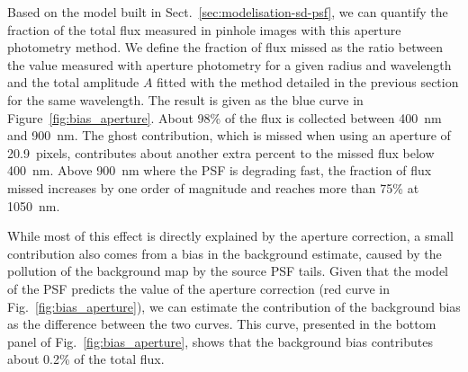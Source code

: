 Based on the model built in Sect.~\ref{sec:modelisation-sd-psf}, we can quantify the fraction of the total flux measured in \spinhole pinhole images with this aperture photometry method. We define the fraction of flux missed as the ratio between the value measured with aperture photometry for a given radius and wavelength and the total amplitude $A$ fitted with the method detailed in the previous section for the same wavelength. The result is given as the blue curve in Figure~\ref{fig:bias_aperture}. About 98\% of the flux is collected between \SI{400}{\nano\meter} and \SI{900}{\nano\meter}. The ghost contribution, which is missed when using an aperture of \SI{20.9}{pixels}, contributes about another extra percent to the missed flux below \SI{400}{\nano\meter}. Above \SI{900}{\nano\meter} where the PSF is degrading fast, the fraction of flux missed increases by one order of magnitude and reaches more than 75\% at \SI{1050}{nm}.

While most of this effect is directly explained by the aperture correction, a small contribution also comes from a bias in the background estimate, caused by the pollution of the background map by the source PSF tails. Given that the model of the PSF predicts the value of the aperture correction (red curve in Fig.~\ref{fig:bias_aperture}), we can estimate the contribution of the background bias as the difference between the two curves. This curve, presented in the bottom panel of Fig.~\ref{fig:bias_aperture}, shows that the background bias contributes about 0.2\% of the total flux.


